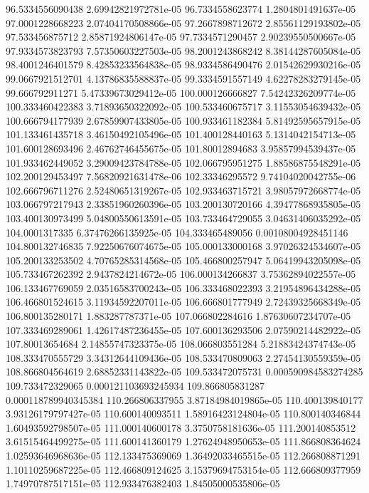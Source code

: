 {96.5334556090438 2.69942821972781e-05
96.7334558623774 1.2804801491637e-05
97.0001228668223 2.07404170508866e-05
97.2667898712672 2.85561129193802e-05
97.533456875712 2.85871924806147e-05
97.7334571290457 2.90239550500667e-05
97.9334573823793 7.57350603227503e-05
98.2001243868242 8.38144287605084e-05
98.4001246401579 8.42853233564838e-05
98.9334586490476 2.01542629930216e-05
99.0667921512701 4.13786835588837e-05
99.3334591557149 4.62278283279145e-05
99.666792911271 5.47339673029412e-05
100.000126666827 7.54242326209774e-05
100.333460422383 3.71893650322092e-05
100.533460675717 3.11553054639432e-05
100.666794177939 2.67859907433805e-05
100.933461182384 5.81492595657915e-05
101.133461435718 3.46150492105496e-05
101.400128440163 5.1314042154713e-05
101.600128693496 2.46762746455675e-05
101.80012894683 3.95857994539437e-05
101.933462449052 3.29009423784788e-05
102.066795951275 1.88586875548291e-05
102.200129453497 7.56820921631478e-06
102.33346295572 9.74104020042755e-06
102.666796711276 2.52480651319267e-05
102.933463715721 3.98057972668774e-05
103.066797217943 2.33851960260396e-05
103.200130720166 4.39477868935805e-05
103.400130973499 5.04800550613591e-05
103.733464729055 3.04631406035292e-05
104.0001317335 6.37476266135925e-05
104.333465489056 0.00108004928451146
104.800132746835 7.92250676074675e-05
105.000133000168 3.97026324534607e-05
105.200133253502 4.70765285314568e-05
105.466800257947 5.06419943205098e-05
105.733467262392 2.9437824214672e-05
106.000134266837 3.75362894022557e-05
106.133467769059 2.03516583700243e-05
106.333468022393 3.21954896434288e-05
106.466801524615 3.11934592207011e-05
106.666801777949 2.72439325668349e-05
106.800135280171 1.883287787371e-05
107.066802284616 1.87630607234707e-05
107.333469289061 1.42617487236455e-05
107.600136293506 2.07590214482922e-05
107.80013654684 2.14855747323375e-05
108.066803551284 5.21883424374743e-05
108.333470555729 3.34312644109436e-05
108.533470809063 2.27454130559359e-05
108.866804564619 2.68852331143822e-05
109.533472075731 0.000590984583274285
109.733472329065 0.000121103693245934
109.866805831287 0.000118789940345384
110.266806337955 3.87184984019865e-05
110.400139840177 3.93126179797427e-05
110.600140093511 1.58916423124804e-05
110.800140346844 1.60493592798507e-05
111.000140600178 3.3750758181636e-05
111.200140853512 3.61515464499275e-05
111.600141360179 1.27624948950653e-05
111.866808364624 1.02593646968636e-05
112.133475369069 1.36492033465515e-05
112.266808871291 1.10110259687225e-05
112.466809124625 3.15379694753154e-05
112.666809377959 1.74970787517151e-05
112.933476382403 1.84505000535806e-05
}

